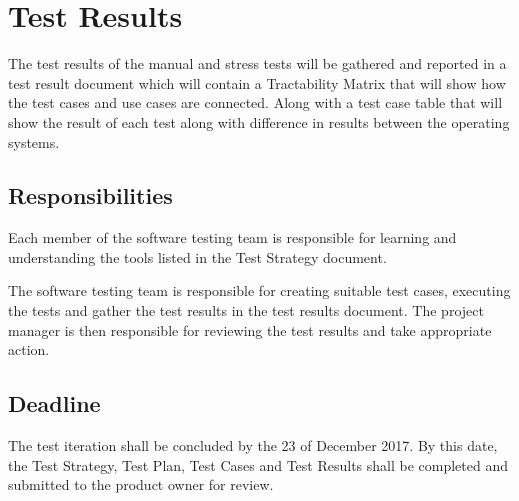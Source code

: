 \documentclass[a4paper, 12pt]{article}
\begin{document}
\section{Test Results}
The test results of the manual and stress tests will be gathered and reported in a test result document which will contain a Tractability Matrix that will show how the test cases and use cases are connected. Along with a test case table that will show the result of each test along with difference in results between the operating systems.

\subsection{Responsibilities}
Each member of the software testing team is responsible for learning and understanding the tools listed in the Test Strategy document. 

The software testing team is responsible for creating suitable test cases, executing the tests and gather the test results in the test results document. The project manager is then responsible for reviewing the test results and take appropriate action.

\subsection{Deadline}
The test iteration shall be concluded by the 23 of December 2017. By this date, the Test Strategy, Test Plan, Test Cases and Test Results shall be completed and submitted to the product owner for review. 
\end{document}
